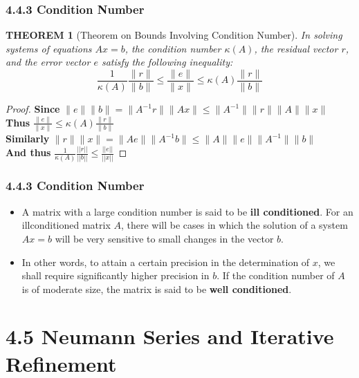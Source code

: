 \documentclass[notheorems,mathserif,table,compress]{beamer}  %
\begin{document}
\begin{frame}
  \frametitle{4.4.3 Condition Number}
  \newtheorem{theorem3}[theorem1]{THEOREM}
  \begin{theorem3}[Theorem on Bounds Involving Condition Number]
  In solving systems of equations $Ax=b$, the condition number $\kappa
(A)$, the residual vector $r$, and the error vector $e$ satisfy the following inequality:
  \[ \frac{1}{\kappa(A)}\frac{\parallel r\parallel}{\parallel b\parallel}\le \frac{\parallel e\parallel}{\parallel x\parallel}\le \kappa(A)\frac{\parallel r\parallel}{\parallel b\parallel} \]
  \end{theorem3}
  \begin{proof}
  \textbf{Since} $\parallel e\parallel\parallel b\parallel=\parallel A^{-1}r\parallel \parallel Ax\parallel \le \parallel A^{-1}\parallel \parallel r\parallel \parallel A\parallel \parallel x\parallel$ \\
  \textbf{Thus} $\frac{\parallel e\parallel}{\parallel x\parallel}\le \kappa(A)\frac{\parallel r\parallel}{\parallel b\parallel}$\\
  \textbf{Similarly} $\parallel r\parallel \parallel x\parallel=\parallel Ae\parallel \parallel A^{-1}b\parallel \le \parallel A\parallel \parallel e\parallel \parallel A^{-1}\parallel \parallel b\parallel$\\
  \textbf{And thus} $\frac{1}{\kappa(A)}\frac{||r||}{||b||}\le \frac{||e||}{||x||}$
  \end{proof}
\end{frame}


\begin{frame}
  \frametitle{4.4.3 Condition Number}
  \begin{itemize}
  \item A matrix with a large condition number is said to be \textbf{ill conditioned}. For an illconditioned matrix $A$, there will be cases in which the solution of a system $Ax=b$ will be very sensitive to small changes in the vector $b$. 
  \item In other words, to attain a certain precision in the determination of $x$, we shall require significantly higher precision in $b$. If the condition number of $A$ is of moderate size, the matrix is said to be \textbf{well conditioned}.
  \end{itemize}
\end{frame}


\section{4.5 Neumann Series and Iterative Refinement}
\end{document}
